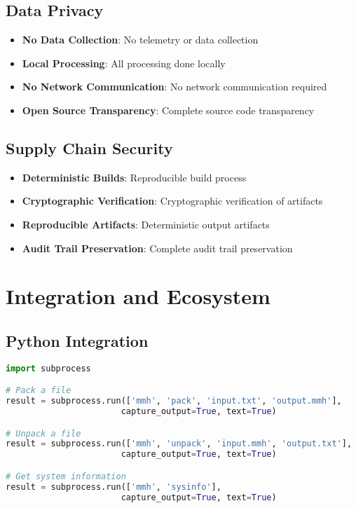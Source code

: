 \documentclass[12pt,a4paper]{article}
\begin{document}
\subsection{Data Privacy}
\begin{itemize}
    \item \textbf{No Data Collection}: No telemetry or data collection
    \item \textbf{Local Processing}: All processing done locally
    \item \textbf{No Network Communication}: No network communication required
    \item \textbf{Open Source Transparency}: Complete source code transparency
\end{itemize}

\subsection{Supply Chain Security}
\begin{itemize}
    \item \textbf{Deterministic Builds}: Reproducible build process
    \item \textbf{Cryptographic Verification}: Cryptographic verification of artifacts
    \item \textbf{Reproducible Artifacts}: Deterministic output artifacts
    \item \textbf{Audit Trail Preservation}: Complete audit trail preservation
\end{itemize}

\newpage

\section{Integration and Ecosystem}

\subsection{Python Integration}
\begin{lstlisting}[language=Python, caption=Python Integration Example]
import subprocess

# Pack a file
result = subprocess.run(['mmh', 'pack', 'input.txt', 'output.mmh'], 
                       capture_output=True, text=True)

# Unpack a file
result = subprocess.run(['mmh', 'unpack', 'input.mmh', 'output.txt'], 
                       capture_output=True, text=True)

# Get system information
result = subprocess.run(['mmh', 'sysinfo'], 
                       capture_output=True, text=True)
\end{lstlisting}
\end{document}
